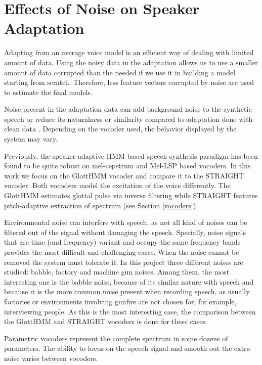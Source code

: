 \section{Effects of Noise on Speaker Adaptation}
\label{noise_speaker_adaptation}
Adapting from an average voice model is an efficient way of dealing with limited amount of data.
%
Using the noisy data in the adaptation allows us to use a smaller amount of data corrupted than the needed if we use it in building a model starting from scratch.
%
Therefore, less feature vectors corrupted by noise are used to estimate the final models.

Noise present in the adaptation data can add background noise to the synthetic speech or reduce its naturalness or similarity compared to adaptation done with clean data \cite{karhila_jstsp_14}.
%
Depending on the vocoder used, the behavior displayed by the system may vary.

Previously, the speaker-adaptive HMM-based speech synthesis paradigm has been found to be quite robust on mel-cepstrum \cite{karhila_jstsp_14, yamagishi2008robustness} and Mel-LSP \cite{Yanagisawa_SSW8} based vocoders.
%
In this work we focus on the GlottHMM vocoder and compare it to the STRAIGHT vocoder.
%
Both vocoders model the excitation of the voice differently.
%
The GlottHMM estimates glottal pulse via inverse filtering while STRAIGHT features pitch-adaptive extraction of spectrum (see Section \ref{vocoders}).

Environmental noise can interfere with speech, as not all kind of noises can be filtered out of the signal without damaging the speech.
%
Specially, noise signals that are time (and frequency) variant and occupy the same frequency bands provides the most difficult and challenging cases.
%
When the noise cannot be removed the system must tolerate it.
%
In this project three different noises are studied: babble, factory and machine gun noises.
%
Among them, the most interesting one is the babble noise, because of its similar nature with speech and because it is the more common noise present when recording speech, as usually factories or environments involving gunfire are not chosen for, for example, interviewing people.
%
As this is the most interesting case, the comparison between the GlottHMM and STRAIGHT vocoders is done for these cases.

Parametric vocoders represent the complete spectrum in some dozens of parameters.
%
The ability to focus on the speech signal and smooth out the extra noise varies between vocoders.

